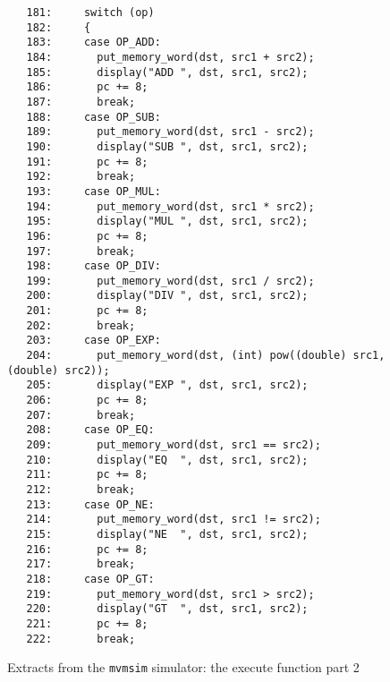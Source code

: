 \begin{figure}
\hspace*{0cm}
\begin{minipage}{30cm}
\footnotesize
\begin{verbatim}
   181:     switch (op)
   182:     {
   183:     case OP_ADD:
   184:       put_memory_word(dst, src1 + src2);
   185:       display("ADD ", dst, src1, src2);
   186:       pc += 8;
   187:       break;
   188:     case OP_SUB:
   189:       put_memory_word(dst, src1 - src2);
   190:       display("SUB ", dst, src1, src2);
   191:       pc += 8;
   192:       break;
   193:     case OP_MUL:
   194:       put_memory_word(dst, src1 * src2);
   195:       display("MUL ", dst, src1, src2);
   196:       pc += 8;
   197:       break;
   198:     case OP_DIV:
   199:       put_memory_word(dst, src1 / src2);
   200:       display("DIV ", dst, src1, src2);
   201:       pc += 8;
   202:       break;
   203:     case OP_EXP:
   204:       put_memory_word(dst, (int) pow((double) src1, (double) src2));
   205:       display("EXP ", dst, src1, src2);
   206:       pc += 8;
   207:       break;
   208:     case OP_EQ:
   209:       put_memory_word(dst, src1 == src2);
   210:       display("EQ  ", dst, src1, src2);
   211:       pc += 8;
   212:       break;
   213:     case OP_NE:
   214:       put_memory_word(dst, src1 != src2);
   215:       display("NE  ", dst, src1, src2);
   216:       pc += 8;
   217:       break;
   218:     case OP_GT:
   219:       put_memory_word(dst, src1 > src2);
   220:       display("GT  ", dst, src1, src2);
   221:       pc += 8;
   222:       break;
\end{verbatim}
\end{minipage}
\caption{Extracts from the {\tt mvmsim} simulator: the execute function part 2}
\label{mvmsim3}
\end{figure}

